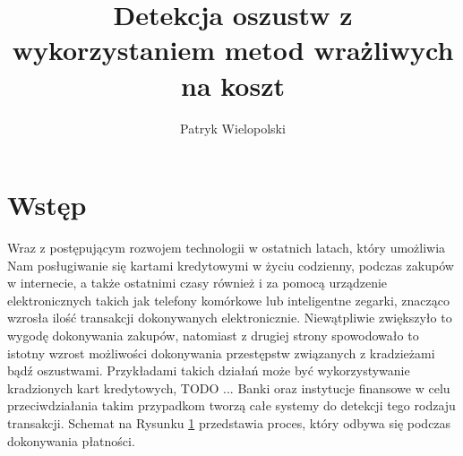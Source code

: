 \documentclass{book}
\title{Detekcja oszustw z wykorzystaniem metod wrażliwych na koszt}
\author{Patryk Wielopolski}
\begin{document}
	
	\newcommand{\htx}{h_{\theta}(\boldsymbol{x_i})}
	\newcommand{\es}{\mathcal{S}}
	\newcommand{\ef}{\mathcal{F}}
	\newcommand{\iks}{\boldsymbol{x}}
	\newcommand{\bes}{\boldsymbol{S}}
	\newcommand{\yht}[1]{y_i^{(#1)}}
	\newcommand{\ylab}[2]{\text{#1}_{\text{#2}}}
	
	\newenvironment{talign}
	{\align}
	{\endalign}
	
	\newenvironment{talign*}
	{\csname align*\endcsname}
	{\endalign}

\maketitle

\chapter{Wstęp}
	Wraz z postępującym rozwojem technologii w ostatnich latach, który umożliwia Nam posługiwanie się kartami kredytowymi w życiu codzienny, podczas zakupów w internecie, a także ostatnimi czasy również i za pomocą urządzenie elektronicznych takich jak telefony komórkowe lub inteligentne zegarki, znacząco wzrosła ilość transakcji dokonywanych elektronicznie. Niewątpliwie zwiększyło to wygodę dokonywania zakupów, natomiast z drugiej strony spowodowało to istotny wzrost możliwości dokonywania przestępstw związanych z kradzieżami bądź oszustwami. Przykładami takich działań może być wykorzystywanie kradzionych kart kredytowych, TODO ... 
	Banki oraz instytucje finansowe w celu przeciwdziałania takim przypadkom tworzą całe systemy do detekcji tego rodzaju transakcji. Schemat na Rysunku \ref{} przedstawia proces, który odbywa się podczas dokonywania płatności. 
	
\end{document}
